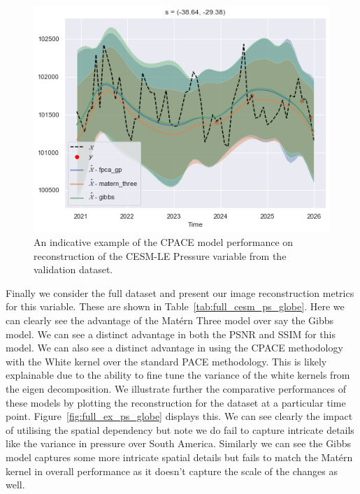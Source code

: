 \begin{figure}
	\centering
	\includegraphics[width=\textwidth]{train_ex_ps_globe}
	\caption{An indicative example of the CPACE model performance on reconstruction of the CESM-LE Pressure variable from the validation dataset.}
	\label{fig:train_ex_ps_globe}
\end{figure}

Finally we consider the full dataset and present our image reconstruction metrics for this variable.
These are shown in Table~\ref{tab:full_cesm_ps_globe}.
Here we can clearly see the advantage of the Mat\'ern Three model over say the Gibbs model.
We can see a distinct advantage in both the PSNR and SSIM for this model.
We can also see a distinct advantage in using the CPACE methodology with the White kernel over the standard PACE methodology.
This is likely explainable due to the ability to fine tune the variance of the white kernels from the eigen decomposition. 
We illustrate further the comparative performances of these models by plotting the reconstruction for the dataset at a particular time point.
Figure~\ref{fig:full_ex_ps_globe} displays this.
We can see clearly the impact of utilising the spatial dependency but note we do fail to capture intricate details like the variance in pressure over South America.
Similarly we can see the Gibbs model captures some more intricate  spatial details but fails to match the Mat\'ern kernel in overall performance as it doesn't capture the scale of the changes as well. 

